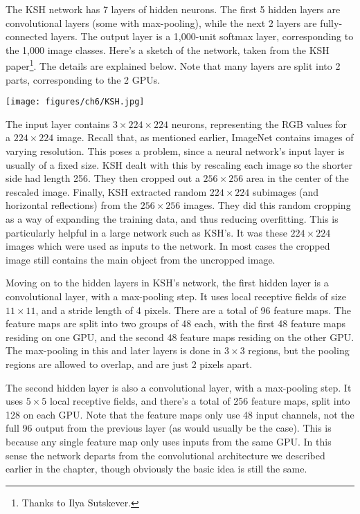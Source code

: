\documentclass[a4paper,twoside,10pt]{book}
\begin{document}
The KSH network has 7 layers of hidden neurons. The first 5 hidden layers are convolutional layers (some with max-pooling), while the next 2 layers are fully-connected layers. The output layer is a 1,000-unit softmax layer, corresponding to the 1,000 image classes. Here's a sketch of the network, taken from the KSH paper\footnote{Thanks to Ilya Sutskever.}. The details are explained below. Note that many layers are split into 2 parts, corresponding to the 2 GPUs.
\begin{center}
	\texttt{[image: figures/ch6/KSH.jpg]}
\end{center}
The input layer contains $3\times224\times224$ neurons, representing the RGB values for a $224\times224$ image. Recall that, as mentioned earlier, ImageNet contains images of varying resolution. This poses a problem, since a neural network's input layer is usually of a fixed size. KSH dealt with this by rescaling each image so the shorter side had length 256. They then cropped out a $256\times256$ area in the center of the rescaled image. Finally, KSH extracted random $224\times224$ subimages (and horizontal reflections) from the $256\times256$ images. They did this random cropping as a way of expanding the training data, and thus reducing overfitting. This is particularly helpful in a large network such as KSH's. It was these $224\times224$ images which were used as inputs to the network. In most cases the cropped image still contains the main object from the uncropped image.

Moving on to the hidden layers in KSH's network, the first hidden layer is a convolutional layer, with a max-pooling step. It uses local receptive fields of size $11\times11$, and a stride length of 4 pixels. There are a total of 96 feature maps. The feature maps are split into two groups of 48 each, with the first 48 feature maps residing on one GPU, and the second 48 feature maps residing on the other GPU. The max-pooling in this and later layers is done in $3\times3$ regions, but the pooling regions are allowed to overlap, and are just 2 pixels apart.

The second hidden layer is also a convolutional layer, with a max-pooling step. It uses $5\times5$ local receptive fields, and there's a total of 256 feature maps, split into 128 on each GPU. Note that the feature maps only use 48 input channels, not the full 96 output from the previous layer (as would usually be the case). This is because any single feature map only uses inputs from the same GPU. In this sense the network departs from the convolutional architecture we described earlier in the chapter, though obviously the basic idea is still the same.
\end{document}
